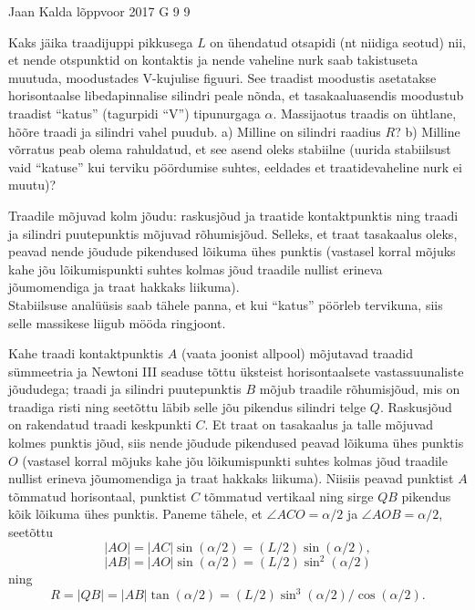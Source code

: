 {Jaan Kalda} %
{lõppvoor} %
{2017} %
{G 9} %
{9} %
{
\ifStatement
Kaks jäika traadijuppi pikkusega $L$ on ühendatud otsapidi (nt niidiga seotud) nii, et nende otspunktid on kontaktis ja nende vaheline nurk saab takistuseta muutuda, moodustades V-kujulise figuuri. See traadist moodustis asetatakse horisontaalse libedapinnalise silindri peale nõnda, et tasakaaluasendis moodustub traadist \enquote{katus} (tagurpidi \enquote{V}) tipunurgaga $\alpha$. Massijaotus traadis on ühtlane, hõõre traadi ja silindri vahel puudub. a) Milline on silindri raadius $R$? b) Milline võrratus peab olema rahuldatud, et see asend oleks stabiilne (uurida stabiilsust vaid \enquote{katuse} kui terviku pöördumise suhtes, eeldades et traatidevaheline nurk ei muutu)?
\fi


\ifHint
Traadile mõjuvad kolm jõudu: raskusjõud ja traatide kontaktpunktis ning traadi ja silindri puutepunktis mõjuvad rõhumisjõud. Selleks, et traat tasakaalus oleks, peavad nende jõudude pikendused lõikuma ühes punktis (vastasel korral mõjuks kahe jõu lõikumispunkti suhtes kolmas jõud traadile nullist erineva jõumomendiga ja traat hakkaks liikuma).\\
Stabiilsuse analüüsis saab tähele panna, et kui \enquote{katus} pöörleb tervikuna, siis selle massikese liigub mööda ringjoont.
\fi


\ifSolution
Kahe traadi kontaktpunktis $A$ (vaata joonist allpool) mõjutavad traadid sümmeetria ja Newtoni III seaduse tõttu üksteist 
horisontaalsete vastassuunaliste jõududega; traadi ja silindri puutepunktis $B$ mõjub traadile rõhumisjõud, mis on traadiga risti ning seetõttu läbib selle jõu pikendus silindri telge $Q$. Raskusjõud on rakendatud traadi keskpunkti $C$.  Et traat on tasakaalus ja talle mõjuvad kolmes punktis jõud, siis nende jõudude pikendused peavad lõikuma ühes punktis $O$ (vastasel korral mõjuks kahe jõu lõikumispunkti suhtes kolmas jõud traadile nullist erineva jõumomendiga ja traat hakkaks liikuma). Niisiis peavad punktist $A$ tõmmatud horisontaal, punktist $C$ tõmmatud vertikaal ning sirge $QB$ pikendus kõik lõikuma ühes punktis. Paneme tähele, et $\angle ACO=\alpha/2$ ja $\angle AOB=\alpha/2$, seetõttu
$$|AO|=|AC|\sin(\alpha/2)=(L/2)\sin(\alpha/2),$$ $$|AB|=|AO|\sin(\alpha/2)=(L/2)\sin^2(\alpha/2)$$ ning
$$R=|QB|=|AB|\tan(\alpha/2)=(L/2)\sin^3(\alpha/2)/\cos(\alpha/2).$$

}

